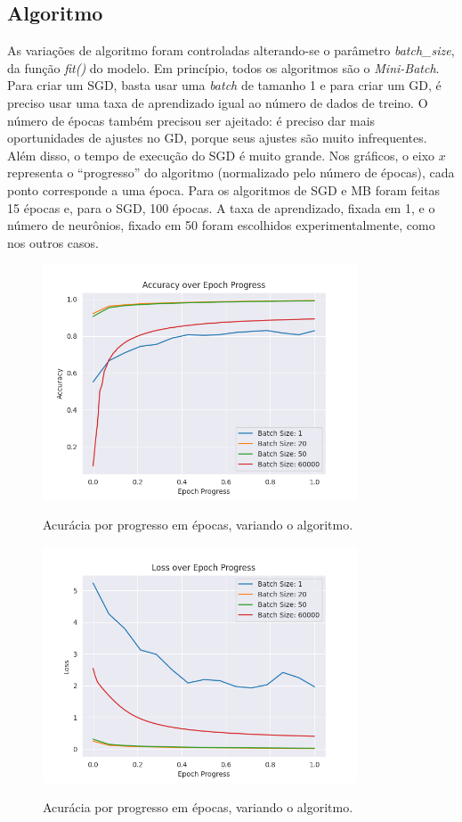 \documentclass[a4paper]{article}
\begin{document}
\subsection{Algoritmo}%
\label{sub:Algoritmo}

As variações de algoritmo foram controladas alterando-se o parâmetro \textit{batch\_size}, da função \textit{fit()} do modelo. Em princípio, todos os algoritmos são o \textit{Mini-Batch}. Para criar um SGD, basta usar uma \textit{batch} de tamanho 1 e para criar um GD, é preciso usar uma taxa de aprendizado igual ao número de dados de treino. O número de épocas também precisou ser ajeitado: é preciso dar mais oportunidades de ajustes no GD, porque seus ajustes são muito infrequentes. Além disso, o tempo de execução do SGD é muito grande. Nos gráficos, o eixo $x$ representa o “progresso” do algoritmo (normalizado pelo número de épocas), cada ponto corresponde a uma época. Para os algoritmos de SGD e MB foram feitas 15 épocas e, para o SGD, 100 épocas. A taxa de aprendizado, fixada em 1, e o número de neurônios, fixado em 50 foram escolhidos experimentalmente, como nos outros casos.

\begin{figure}[H]
  \begin{center}
  {\includegraphics[height=7cm]{./images/Accuracy_over_Epoch_var_Alg.png}}
  \end{center}
  \caption{Acurácia por progresso em épocas, variando o algoritmo.\label{fig:aep}}
\end{figure}

\begin{figure}[H]
  \begin{center}
  {\includegraphics[height=7cm]{./images/Loss_over_Epoch_var_Alg.png}}
  \end{center}
  \caption{Acurácia por progresso em épocas, variando o algoritmo. \label{fig:lep}}
\end{figure}
\end{document}
